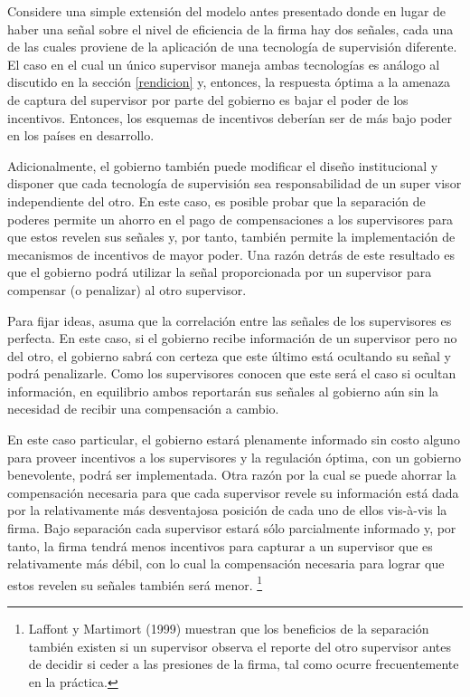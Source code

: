\documentclass[
  12pt,
  spanish,
]{book}
\begin{document}
Considere una simple extensión del modelo antes presentado donde en lugar de haber una señal sobre el nivel de eficiencia de la firma hay dos señales, cada una de las cuales proviene de la aplicación de una tecnología de supervisión diferente. El caso en el cual un único supervisor maneja ambas tecnologías es análogo al discutido en la sección \ref{rendicion} y, entonces, la respuesta óptima a la amenaza de captura del supervisor por parte del gobierno es bajar el poder de los incentivos. Entonces, los esquemas de incentivos deberían ser de más bajo poder en los países en desarrollo.

Adicionalmente, el gobierno también puede modificar el diseño institucional y disponer que cada tecnología de supervisión sea responsabilidad de un super visor independiente del otro. En este caso, es posible probar que la separación de poderes permite un ahorro en el pago de compensaciones a los supervisores para que estos revelen sus señales y, por tanto, también permite la implementación de mecanismos de incentivos de mayor poder. Una razón detrás de este resultado es que el gobierno podrá utilizar la señal proporcionada por un supervisor para compensar (o penalizar) al otro supervisor.

Para fijar ideas, asuma que la correlación entre las señales de los supervisores es perfecta. En este caso, si el gobierno recibe información de un supervisor pero no del otro, el gobierno sabrá con certeza que este último está ocultando su señal y podrá penalizarle. Como los supervisores conocen que este será el caso si ocultan información, en equilibrio ambos reportarán sus señales al gobierno aún sin la necesidad de recibir una compensación a cambio.

En este caso particular, el gobierno estará plenamente informado sin costo alguno para proveer incentivos a los supervisores y la regulación óptima, con un gobierno benevolente, podrá ser implementada. Otra razón por la cual se puede ahorrar la compensación necesaria para que cada supervisor revele su información está dada por la relativamente más desventajosa posición de cada uno de ellos vis-à-vis la firma. Bajo separación cada supervisor estará sólo parcialmente informado y, por tanto, la firma tendrá menos incentivos para capturar a un supervisor que es relativamente más débil, con lo cual la compensación necesaria para lograr que estos revelen su señales también será menor.
\footnote{Laffont y Martimort (1999) muestran que los beneficios de la separación también existen si un supervisor observa el reporte del otro supervisor antes de decidir si ceder a las presiones de la firma, tal como ocurre frecuentemente en la práctica.}
\end{document}
